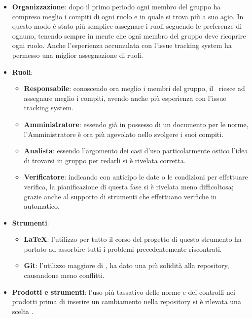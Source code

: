     \begin{itemize}
        \item \textbf{Organizzazione}: dopo il primo periodo ogni membro del gruppo ha compreso meglio i compiti di ogni ruolo e in quale si trova più a suo agio. In questo modo è stato più semplice assegnare i ruoli seguendo le preferenze di ognuno, tenendo sempre in mente che ogni membro del gruppo deve ricoprire ogni ruolo. Anche l'esperienza accumulata con l'issue tracking system ha permesso una miglior assegnazione di ruoli.
        \item \textbf{Ruoli}:
            \begin{itemize}
                \item \textbf{Responsabile}: conoscendo ora meglio i membri del gruppo, il \Res\ riesce ad assegnare meglio i compiti, avendo anche più esperienza con l'issue tracking system.
                \item \textbf{Amministratore}: essendo già in possesso di un documento per le norme, l'Amministratore è ora più agevolato nello svolgere i suoi compiti.
                \item \textbf{Analista}: essendo l'argomento dei casi d'uso particolarmente ostico l'idea di trovarsi in gruppo per redarli si è rivelata corretta.
                \item \textbf{Verificatore}: indicando con anticipo le date o le condizioni per effettuare verifica, la pianificazione di questa fase si è rivelata meno difficoltosa; grazie anche al supporto di strumenti che effettuano verifiche in automatico.
            \end{itemize}
        \item \textbf{Strumenti}:
            \begin{itemize}
                \item \textbf{\LaTeX}: l'utilizzo per tutto il corso del progetto di questo strumento ha portato ad assorbire tutti i problemi precedentemente riscontrati.
                \item \textbf{Git}: l'utilizzo maggiore di , ha dato una più solidità alla repository, causandone meno conflitti.
            \end{itemize}
        \item \textbf{Prodotti e strumenti}: l'uso più tassativo delle norme e dei controlli nei prodotti prima di inserire un cambiamento nella repository si è rilevata una scelta .
    \end{itemize}

